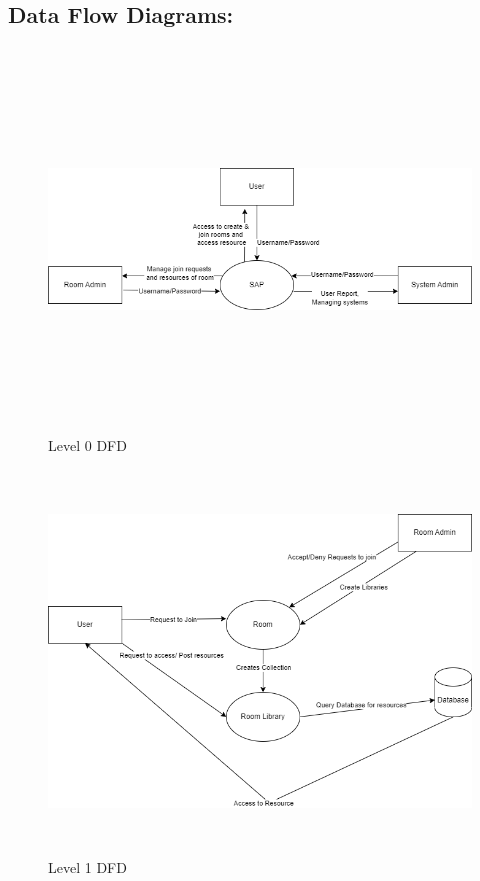 \subsection{Data Flow Diagrams:}
\begin{figure}[h]
    \centering
    \includegraphics[width=6in, height=4in]{Proposal/static/dfd_0.png}
    \caption{Level 0 DFD}
    \label{fig:enter-label}
\end{figure}
\newpage

\begin{figure}[h]
    \centering
    \includegraphics[width=6in, height=4in]{Proposal/static/dfd_1.png}
    \caption{Level 1 DFD}
    \label{fig:enter-label}
\end{figure}
\newpage

